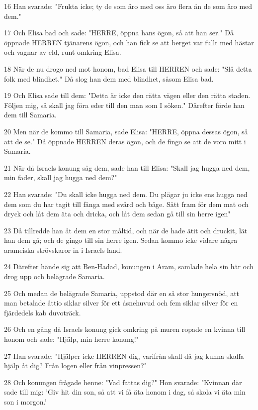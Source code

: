 \par 16 Han svarade: "Frukta icke; ty de som äro med oss äro flera än de som äro med dem."
\par 17 Och Elisa bad och sade: "HERRE, öppna hans ögon, så att han ser." Då öppnade HERREN tjänarens ögon, och han fick se att berget var fullt med hästar och vagnar av eld, runt omkring Elisa.
\par 18 När de nu drogo ned mot honom, bad Elisa till HERREN och sade: "Slå detta folk med blindhet." Då slog han dem med blindhet, såsom Elisa bad.
\par 19 Och Elisa sade till dem: "Detta är icke den rätta vägen eller den rätta staden. Följen mig, så skall jag föra eder till den man som I söken." Därefter förde han dem till Samaria.
\par 20 Men när de kommo till Samaria, sade Elisa: "HERRE, öppna dessas ögon, så att de se." Då öppnade HERREN deras ögon, och de fingo se att de voro mitt i Samaria.
\par 21 När då Israels konung såg dem, sade han till Elisa: "Skall jag hugga ned dem, min fader, skall jag hugga ned dem?"
\par 22 Han svarade: "Du skall icke hugga ned dem. Du plägar ju icke ens hugga ned dem som du har tagit till fånga med svärd och båge. Sätt fram för dem mat och dryck och låt dem äta och dricka, och låt dem sedan gå till sin herre igen"
\par 23 Då tillredde han åt dem en stor måltid, och när de hade ätit och druckit, lät han dem gå; och de gingo till sin herre igen. Sedan kommo icke vidare några arameiska strövskaror in i Israels land.
\par 24 Därefter hände sig att Ben-Hadad, konungen i Aram, samlade hela sin här och drog upp och belägrade Samaria.
\par 25 Och medan de belägrade Samaria, uppstod där en så stor hungersnöd, att man betalade åttio siklar silver för ett åsnehuvud och fem siklar silver för en fjärdedels kab duvoträck.
\par 26 Och en gång då Israels konung gick omkring på muren ropade en kvinna till honom och sade: "Hjälp, min herre konung!"
\par 27 Han svarade: "Hjälper icke HERREN dig, varifrån skall då jag kunna skaffa hjälp åt dig? Från logen eller från vinpressen?"
\par 28 Och konungen frågade henne: "Vad fattas dig?" Hon svarade: "Kvinnan där sade till mig: 'Giv hit din son, så att vi få äta honom i dag, så skola vi äta min son i morgon.'
